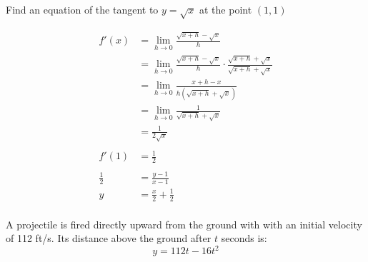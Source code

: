 \documentclass[letterpaper, landscape]{exam}
\begin{document}
\begin{questions}
      \question[10] Find an equation of the tangent to $y = \sqrt{x}$ at the point $(1, 1)$
      \begin{solution}
        \begin{align*}
          f'(x) & = \lim_{h \to 0} \frac{\sqrt{x + h} - \sqrt{x}}{h} \\
                & = \lim_{h \to 0} \frac{\sqrt{x + h} - \sqrt{x}}{h} 
                      \cdot \frac{\sqrt{x + h} + \sqrt{x}}{\sqrt{x + h} + \sqrt{x}} \\
                & = \lim_{h \to 0} \frac{x + h - x}{h \left( \sqrt{x + h} + \sqrt{x} \right)} \\
                & = \lim_{h \to 0} \frac{1}{ \sqrt{x + h} + \sqrt{x} } \\
                & = \frac{1}{2 \sqrt{x}} \\
          \\
          f'(1) &= \frac{1}{2} \\
          \\
          \frac{1}{2} & = \frac{y - 1}{x - 1} \\
          y           & = \boxed{ \frac{x}{2} + \frac{1}{2} } \\
        \end{align*}
      \end{solution}

      \ifprintanswers
        \newpage
      \fi

      \question
      A projectile is fired directly upward from the ground with with an initial velocity
      of 112 ft/s. Its distance above the ground after $t$ seconds is:
      \[
        y = 112t - 16t^2 
      \]

\end{questions}
\end{document}
